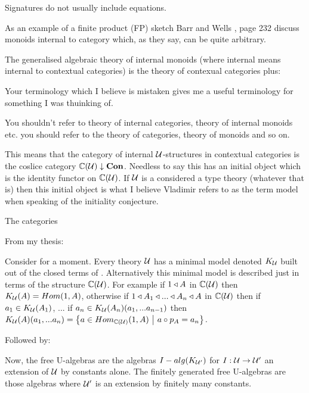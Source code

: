 \note
Signatures do not usually include equations.

\note
As an example of a finite product (FP) sketch Barr and Wells \cite{BarrandWells}, page 232 discuss monoids internal to  category which, as they say, can be quite  arbitrary.


\note The generalised algebraic theory of internal monoids (where internal means internal to contextual categories) 
is the theory of contexual categories plus:

\note
Your terminology which I believe is mistaken gives me a useful terminology for something I was thuinking of.
\begin{notebox}
You  shouldn't refer to theory of internal categories, theory of internal monoids etc. you should refer to the
theory of categories, theory of monoids and so on.
\end{notebox}




\note This means that the category of internal $\gat[U]$-structures in contextual categories is the coslice category
$\CofU \downarrow \catCon$. Needless to say this has an initial object which is the identity functor on  $\CofU$.
If $\gat[U]$ is a considered a type theory (whatever that is) then this initial object is what I believe Vladimir refers
to as the term model when speaking of the initiality conjecture.

\note The categories 

\note From my thesis:
\begin{tightquote}
Consider for a moment. Every theory $\gat[U]$ has a minimal model denoted $\KU$ built out of the closed terms of \gat[U]. Alternatively this minimal model is described just in terms of the structure $\CofU$. For example
if $1 \base A$ in $\CofU$ then 
$\KU(A)=Hom(1,A)$, otherwise if $1 \base A_1 \base ... \base A_n \base A$ in $\CofU$
then if $a_1 \in \KU(A_1)$, ... if $a_n \in \KU(A_n)(a_1,...a_{n-1})$ then 
$\KU(A)(a_1,...a_n)=\setsuchthat{a\in Hom_{\CofU}(1,A)}{a \circ p_A = a_n}$. \\
\end{tightquote} 

Followed by:
\begin{tightquote}
Now, the free U-algebras are the algebras $I-alg(\KUp)$ for $I: \gat[U] \morph \gat[U']$ an extension of $\gat[U]$ by constants alone. The finitely generated free U-algebras are those algebras where $\gat[U']$ is an extension by finitely many constants. \\
\end{tightquote}

